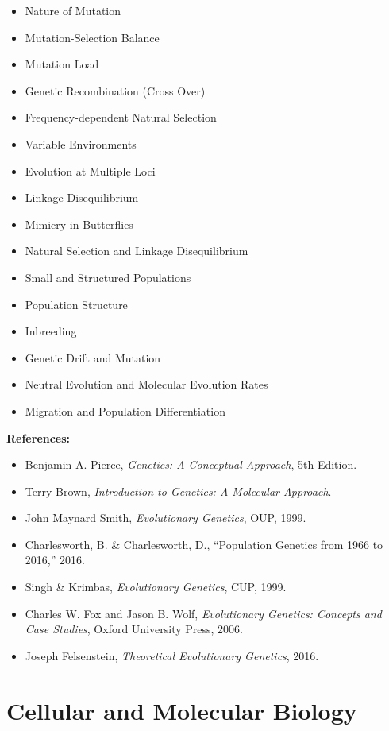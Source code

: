 \documentclass[12pt]{article}
\begin{document}
\begin{itemize}
\begin{itemize}
        \item Nature of Mutation
        \item Mutation-Selection Balance
        \item Mutation Load
        \item Genetic Recombination (Cross Over)
        \item Frequency-dependent Natural Selection
        \item Variable Environments
        \item Evolution at Multiple Loci
        \item Linkage Disequilibrium
        \item Mimicry in Butterflies
        \item Natural Selection and Linkage Disequilibrium
        \item Small and Structured Populations
        \item Population Structure
        \item Inbreeding
        \item Genetic Drift and Mutation
        \item Neutral Evolution and Molecular Evolution Rates
        \item Migration and Population Differentiation
    \end{itemize}
\end{itemize}

\textbf{References:}
\begin{itemize}
    \item Benjamin A. Pierce, \textit{Genetics: A Conceptual Approach}, 5th Edition.
    \item Terry Brown, \textit{Introduction to Genetics: A Molecular Approach}.
    \item John Maynard Smith, \textit{Evolutionary Genetics}, OUP, 1999.
    \item Charlesworth, B. \& Charlesworth, D., “Population Genetics from 1966 to 2016,” 2016.
    \item Singh \& Krimbas, \textit{Evolutionary Genetics}, CUP, 1999.
    \item Charles W. Fox and Jason B. Wolf, \textit{Evolutionary Genetics: Concepts and Case Studies}, Oxford University Press, 2006.
    \item Joseph Felsenstein, \textit{Theoretical Evolutionary Genetics}, 2016.
\end{itemize}

\newpage

\section{Cellular and Molecular Biology}
\end{document}

